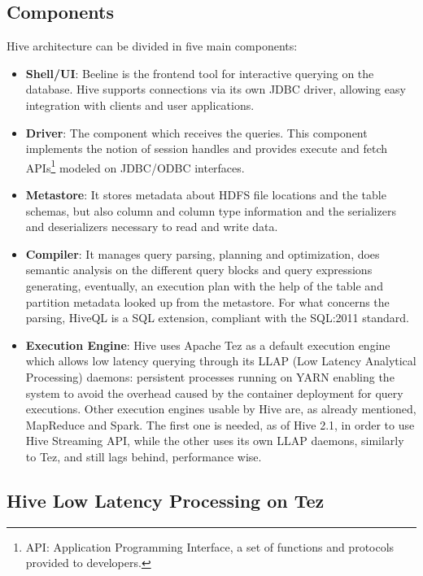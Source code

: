 \subsection{Components}

Hive architecture can be divided in five main components:

\begin{itemize}
    \item \textbf{Shell/UI}: Beeline is the frontend tool for interactive querying on the database. Hive supports connections via its own JDBC driver, allowing easy integration with clients and user applications.
    \item \textbf{Driver}: The component which receives the queries. This component implements the notion of session handles and provides execute and fetch APIs\footnote{API: Application Programming Interface, a set of functions and protocols provided to developers.} modeled on JDBC/ODBC interfaces.
    \item \textbf{Metastore}: It stores metadata about HDFS file locations and the table schemas, but also column and column type information and the serializers and deserializers necessary to read and write data.
    \item \textbf{Compiler}: It manages query parsing, planning and optimization, does semantic analysis on the different query blocks and query expressions generating, eventually, an execution plan with the help of the table and partition metadata looked up from the metastore. For what concerns the parsing, HiveQL is a SQL extension, compliant with the SQL:2011 standard.
    \item \textbf{Execution Engine}: Hive uses Apache Tez as a default execution engine  which allows low latency querying through its LLAP (Low Latency Analytical Processing) daemons: persistent processes running on YARN enabling the system to avoid the overhead caused by the container deployment for query executions. Other execution engines usable by Hive are, as already mentioned, MapReduce and Spark. The first one is needed, as of Hive 2.1, in order to use Hive Streaming API, while the other uses its own LLAP daemons, similarly to Tez, and still lags behind, performance wise.
\end{itemize}

\subsection{Hive Low Latency Processing on Tez}


